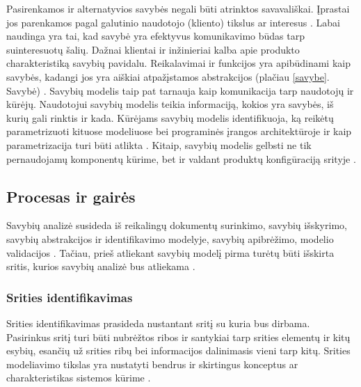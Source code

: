 \documentclass{VUMIFPSkursinis}
\begin{document}
Pasirenkamos ir alternatyvios savybės negali būti atrinktos savavališkai. Įprastai jos parenkamos pagal galutinio naudotojo (kliento) tikslus ar interesus \cite{Kang1990}. Labai naudinga yra tai, kad savybė yra efektyvus komunikavimo būdas tarp suinteresuotų šalių. Dažnai klientai ir inžinieriai kalba apie produkto charakteristiką savybių pavidalu. Reikalavimai ir funkcijos yra apibūdinami kaip savybės, kadangi jos yra aiškiai atpažįstamos abstrakcijos (plačiau \ref{savybe}. Savybė) \cite{Lee2015}. Savybių modelis taip pat tarnauja kaip komunikacija tarp naudotojų ir kūrėjų. Naudotojui savybių modelis teikia informaciją, kokios yra savybės, iš kurių gali rinktis ir kada. Kūrėjams savybių modelis identifikuoja, ką reikėtų parametrizuoti kituose modeliuose bei programinės įrangos architektūroje ir kaip parametrizacija turi būti atlikta \cite{Kang1990}. Kitaip, savybių modelis gelbsti ne tik pernaudojamų komponentų kūrime, bet ir valdant produktų konfigūraciją srityje \cite{Lee2015}.



\subsection{Procesas ir gairės} \label{procesas}

Savybių analizė susideda iš reikalingų dokumentų surinkimo, savybių išskyrimo, savybių abstrakcijos ir identifikavimo modelyje, savybių apibrėžimo, modelio validacijos \cite{Kang1990}. Tačiau, prieš atliekant savybių modelį pirma turėtų būti išskirta sritis, kurios savybių analizė bus atliekama \cite{Lee2015}. 

\subsubsection{Srities identifikavimas}

Srities identifikavimas prasideda nustantant sritį su kuria bus dirbama. Pasirinkus sritį turi būti nubrėžtos ribos ir santykiai tarp srities elementų ir kitų esybių, esančių už srities ribų bei informacijos dalinimasis vieni tarp kitų. Srities modeliavimo tikslas yra nustatyti bendrus ir skirtingus konceptus ar charakteristikas sistemos kūrime \cite{Lee2015}.  
\end{document}
